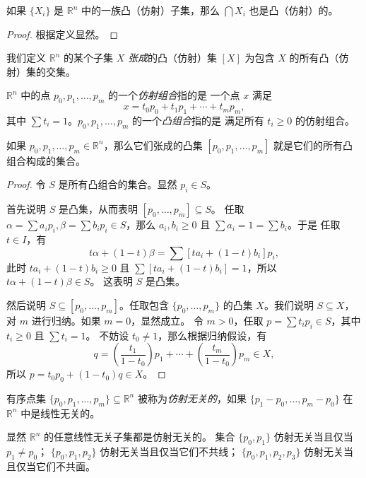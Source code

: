 \documentclass[fontset=none]{Notes}
\begin{document}
\begin{theorem}
  如果 $\{X_i\}$ 是 $\mathbb{R}^n$ 中的一族凸（仿射）子集，那么 $\bigcap X_i$
  也是凸（仿射）的。
\end{theorem}
\begin{proof}
  根据定义显然。
\end{proof}

我们定义 $\mathbb{R}^n$ 的某个子集 $X$ \emph{张成}的凸（仿射）集
$[X]$ 为包含 $X$ 的所有凸（仿射）集的交集。

\begin{definition}
  $\mathbb{R}^n$ 中的点 $p_0,p_1,\dots,p_m$ 的一个\emph{仿射组合}指的是
  一个点 $x$ 满足
  \[
    x=t_0p_0+t_1p_1+\cdots+t_mp_m,
  \]
  其中 $\sum t_i=1$。$p_0,p_1,\dots,p_m$ 的一个\emph{凸组合}指的是
  满足所有 $t_i\geq 0$ 的仿射组合。
\end{definition}

\begin{theorem}
  如果 $p_0,p_1,\dots,p_m\in \mathbb{R}^n$，那么它们张成的凸集 
  $[p_0,p_1,\dots,p_m]$ 就是它们的所有凸组合构成的集合。
\end{theorem}
\begin{proof}
  令 $S$ 是所有凸组合的集合。显然 $p_i\in S$。

  首先说明 $S$ 是凸集，从而表明 $[p_0,\dots,p_m]\subseteq S$。
  任取 $\alpha=\sum a_ip_i, \beta=\sum b_ip_i\in S$，那么
  $a_i,b_i\geq 0$ 且 $\sum a_i=1=\sum b_i$。于是 
  任取 $t\in I$，有
  \[
    t\alpha+(1-t)\beta=\sum [ta_i+(1-t)b_i]p_i,
  \]
  此时 $ta_i+(1-t)b_i\geq 0$ 且
  $\sum [ta_i+(1-t)b_i]=1$，所以 $t\alpha+(1-t)\beta\in S$。
  这表明 $S$ 是凸集。

  然后说明 $S\subseteq [p_0,\dots,p_m]$。任取包含 $\{p_0,\dots,p_m\}$
  的凸集 $X$。我们说明 $S\subseteq X$，对 $m$ 进行归纳。如果 $m=0$，显然成立。
  令 $m>0$，任取 $p=\sum t_ip_i\in S$，其中 $t_i\geq 0$ 且 $\sum t_i=1$。
  不妨设 $t_0\neq 1$，那么根据归纳假设，有
  \[
    q=\left(\frac{t_1}{1-t_0}\right)p_1+\cdots+
    \left(\frac{t_m}{1-t_0}\right)p_m\in X,
  \]
  所以 $p=t_0p_0+(1-t_0)q\in X$。
\end{proof}

\begin{definition}
  有序点集 $\{p_0,p_1,\dots,p_m\}\subseteq \mathbb{R}^n$
  被称为\emph{仿射无关的}，如果 $\{p_1-p_0,\dots,p_m-p_0\}$
  在 $\mathbb{R}^n$ 中是线性无关的。
\end{definition}

显然 $\mathbb{R}^n$ 的任意线性无关子集都是仿射无关的。
集合 $\{p_0,p_1\}$ 仿射无关当且仅当 $p_1\neq p_0$；
$\{p_0,p_1,p_2\}$ 仿射无关当且仅当它们不共线；
$\{p_0,p_1,p_2,p_3\}$ 仿射无关当且仅当它们不共面。
\end{document}
